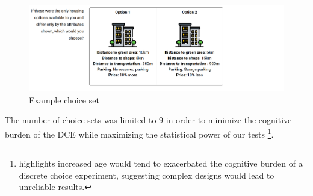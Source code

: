 \documentclass[3p,11pt ]{elsarticle}
\begin{document}
\begin{figure}[H]
\centering
\includegraphics[scale=0.50]{figures/choice_set.png}
\caption{Example choice set \label{fig:choice_set}}
\end{figure}

The number of choice sets was limited to 9 in order to minimize the cognitive burden of the DCE while maximizing the statistical power of our tests \citep{manghamHowNotDesigning2009,deshazoDesigningChoiceSets2002}
\footnote{\cite{himmlerWhatWorksBetter2021} highlights increased age would tend to exacerbated the cognitive burden of a discrete choice experiment, suggesting complex designs would lead to unreliable results.}.









%
%
%

\end{document}
